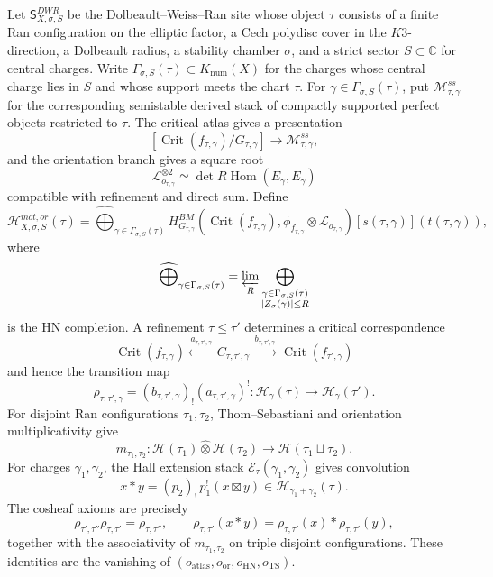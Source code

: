 \begin{construction}
\label{gluing:constr:compact-k3e-hall-cosheaf}
Let \(\mathsf S^{DWR}_{X,\sigma,S}\) be the Dolbeault--Weiss--Ran site
whose object \(\tau\) consists of a finite Ran configuration on the
elliptic factor, a Cech polydisc cover in the \(K3\)-direction, a
Dolbeault radius, a stability chamber \(\sigma\), and a strict sector
\(S\subset\mathbb C\) for central charges. Write
\(\Gamma_{\sigma,S}(\tau)\subset K_{\mathrm{num}}(X)\) for the charges
whose central charge lies in \(S\) and whose support meets the chart
\(\tau\). For \(\gamma\in\Gamma_{\sigma,S}(\tau)\), put
\(\mathcal M_{\tau,\gamma}^{ss}\) for the corresponding semistable
derived stack of compactly supported perfect objects restricted to
\(\tau\). The critical atlas gives a presentation
\[
 [\operatorname{Crit}(f_{\tau,\gamma})/G_{\tau,\gamma}]
 \longrightarrow
 \mathcal M_{\tau,\gamma}^{ss},
\]
and the orientation branch gives a square root
\[
 \mathscr L_{o_{\tau,\gamma}}^{\otimes 2}
 \simeq
 \det R\!\operatorname{Hom}(E_\gamma,E_\gamma)
\]
compatible with refinement and direct sum. Define
\[
 \mathcal H^{mot,or}_{X,\sigma,S}(\tau)
 =
 \widehat{\bigoplus}_{\gamma\in\Gamma_{\sigma,S}(\tau)}
 H^{BM}_{G_{\tau,\gamma}}
 \!\left(
 \operatorname{Crit}(f_{\tau,\gamma}),
 \phi_{f_{\tau,\gamma}}\otimes\mathscr L_{o_{\tau,\gamma}}
 \right)[s(\tau,\gamma)](t(\tau,\gamma)),
\]
where
\[
 \widehat{\bigoplus}_{\gamma\in\Gamma_{\sigma,S}(\tau)}
 =
 \varprojlim_{R}
 \bigoplus_{\substack{\gamma\in\Gamma_{\sigma,S}(\tau)\\
 |Z_\sigma(\gamma)|\le R}}
\]
is the HN completion. A refinement \(\tau\leq\tau'\) determines a
critical correspondence
\[
 \operatorname{Crit}(f_{\tau,\gamma})
 \xleftarrow{\,a_{\tau,\tau',\gamma}\,}
 C_{\tau,\tau',\gamma}
 \xrightarrow{\,b_{\tau,\tau',\gamma}\,}
 \operatorname{Crit}(f_{\tau',\gamma})
\]
and hence the transition map
\[
 \rho_{\tau,\tau',\gamma}
 =
 (b_{\tau,\tau',\gamma})_{!}
 (a_{\tau,\tau',\gamma})^{!}
 \colon
 \mathcal H_{\gamma}(\tau)\longrightarrow
 \mathcal H_{\gamma}(\tau').
\]
For disjoint Ran configurations \(\tau_1,\tau_2\), Thom--Sebastiani and
orientation multiplicativity give
\[
 m_{\tau_1,\tau_2}\colon
 \mathcal H(\tau_1)\widehat\otimes\mathcal H(\tau_2)
 \longrightarrow
 \mathcal H(\tau_1\sqcup\tau_2).
\]
For charges \(\gamma_1,\gamma_2\), the Hall extension stack
\(\mathcal E_{\tau}(\gamma_1,\gamma_2)\) gives convolution
\[
 x*y
 =
 (p_2)_!\,p_1^!(x\boxtimes y)
 \in
 \mathcal H_{\gamma_1+\gamma_2}(\tau).
\]
The cosheaf axioms are precisely
\[
 \rho_{\tau',\tau''}\rho_{\tau,\tau'}=\rho_{\tau,\tau''},
 \qquad
 \rho_{\tau,\tau'}(x*y)=\rho_{\tau,\tau'}(x)*\rho_{\tau,\tau'}(y),
\]
together with the associativity of \(m_{\tau_1,\tau_2}\) on triple
disjoint configurations. These identities are the vanishing of
\((o_{\mathrm{atlas}},o_{\mathrm{or}},o_{\mathrm{HN}},o_{\mathrm{TS}})\).
\end{construction}

